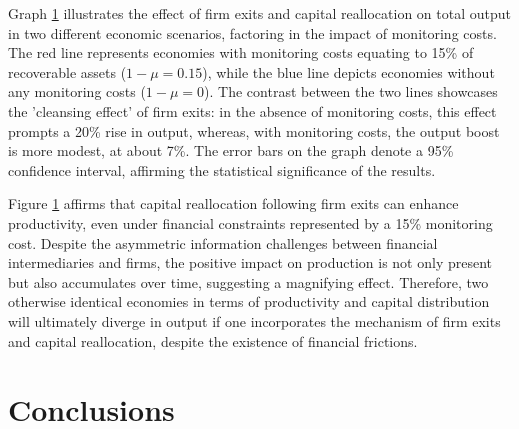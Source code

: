 \documentclass[12pt]{report}
\begin{document}
\begin{figure}
    \label{fig:output_comparison_frictions}
\end{figure}


Graph \ref{fig:output_comparison_frictions} illustrates the effect of firm exits and capital reallocation on total output in two different economic
scenarios, factoring in the impact of monitoring costs. The red line represents economies with monitoring costs equating
to 15\% of recoverable assets (\(1-\mu=0.15\)), while the blue line depicts economies without any monitoring costs
(\(1-\mu=0\)). The contrast between the two lines showcases the 'cleansing effect' of firm exits: in the absence of
monitoring costs, this effect prompts a 20\% rise in output, whereas, with monitoring costs, the output boost is more
modest, at about 7\%. The error bars on the graph denote a 95\% confidence interval, affirming the statistical
significance of the results. 

Figure \ref{fig:output_comparison_frictions} affirms that capital reallocation following firm exits can enhance
productivity, even under financial constraints represented by a 15\% monitoring cost. Despite the asymmetric information
challenges between financial intermediaries and firms, the positive impact on production is not only present but also
accumulates over time, suggesting a magnifying effect. Therefore, two otherwise identical economies in terms of
productivity and capital distribution will ultimately diverge in output if one incorporates the mechanism of firm exits
and capital reallocation, despite the existence of financial frictions. 

\chapter{Conclusions}
\end{document}
